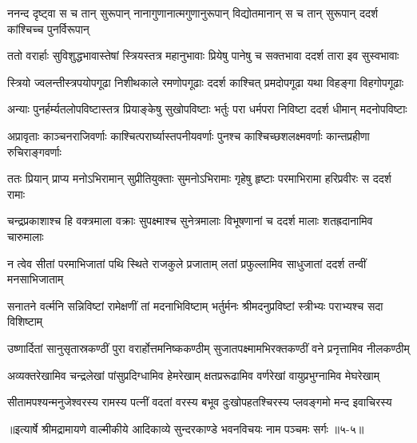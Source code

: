 \twolineshloka
{ननन्द दृष्ट्वा स च तान् सुरूपान् नानागुणानात्मगुणानुरूपान्}
{विद्योतमानान् स च तान् सुरूपान् ददर्श कांश्चिच्च पुनर्विरूपान्} %

\twolineshloka
{ततो वरार्हाः सुविशुद्धभावास्तेषां स्त्रियस्तत्र महानुभावाः}
{प्रियेषु पानेषु च सक्तभावा ददर्श तारा इव सुस्वभावाः} %

\twolineshloka
{स्त्रियो ज्वलन्तीस्त्रपयोपगूढा निशीथकाले रमणोपगूढाः}
{ददर्श काश्चित् प्रमदोपगूढा यथा विहङ्गा विहगोपगूढाः} %

\twolineshloka
{अन्याः पुनर्हर्म्यतलोपविष्टास्तत्र प्रियाङ्केषु सुखोपविष्टाः}
{भर्तुः परा धर्मपरा निविष्टा ददर्श धीमान् मदनोपविष्टाः} %

\twolineshloka
{अप्रावृताः काञ्चनराजिवर्णाः काश्चित्परार्घ्यास्तपनीयवर्णाः}
{पुनश्च काश्चिच्छशलक्ष्मवर्णाः कान्तप्रहीणा रुचिराङ्गवर्णाः} %

\twolineshloka
{ततः प्रियान् प्राप्य मनोऽभिरामान् सुप्रीतियुक्ताः सुमनोऽभिरामाः}
{गृहेषु हृष्टाः परमाभिरामा हरिप्रवीरः स ददर्श रामाः} %

\twolineshloka
{चन्द्रप्रकाशाश्च हि वक्त्रमाला वक्राः सुपक्ष्माश्च सुनेत्रमालाः}
{विभूषणानां च ददर्श मालाः शतह्रदानामिव चारुमालाः} %

\twolineshloka
{न त्वेव सीतां परमाभिजातां पथि स्थिते राजकुले प्रजाताम्}
{लतां प्रफुल्लामिव साधुजातां ददर्श तन्वीं मनसाभिजाताम्} %

\twolineshloka
{सनातने वर्त्मनि सन्निविष्टां रामेक्षणीं तां मदनाभिविष्टाम्}
{भर्तुर्मनः श्रीमदनुप्रविष्टां स्त्रीभ्यः पराभ्यश्च सदा विशिष्टाम्} %

\twolineshloka
{उष्णार्दितां सानुसृतास्रकण्ठीं पुरा वरार्होत्तमनिष्ककण्ठीम्}
{सुजातपक्ष्मामभिरक्तकण्ठीं वने प्रनृत्तामिव नीलकण्ठीम्} %

\twolineshloka
{अव्यक्तरेखामिव चन्द्रलेखां पांसुप्रदिग्धामिव हेमरेखाम्}
{क्षतप्ररूढामिव वर्णरेखां वायुप्रभुग्नामिव मेघरेखाम्} %

\twolineshloka
{सीतामपश्यन्मनुजेश्वरस्य रामस्य पत्नीं वदतां वरस्य}
{बभूव दुःखोपहतश्चिरस्य प्लवङ्गमो मन्द इवाचिरस्य} %


॥इत्यार्षे श्रीमद्रामायणे वाल्मीकीये आदिकाव्ये सुन्दरकाण्डे भवनविचयः नाम पञ्चमः सर्गः ॥५-५॥
